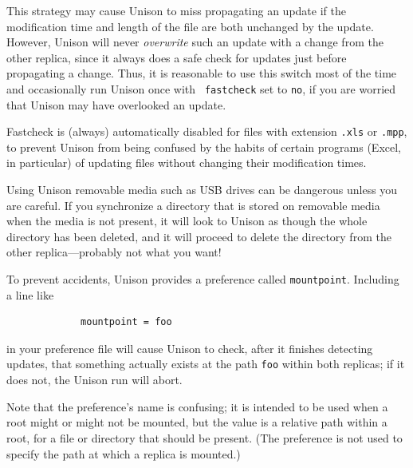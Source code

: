 \documentclass{article}
\begin{document}
This strategy may cause Unison to miss propagating an update if the
 modification time and length of the file are both unchanged
by the update.
However, Unison will never {\em overwrite} such an update with a change
from the other replica, since it always does a safe check for updates
just before propagating a change.  Thus, it is reasonable to use this
switch most of the time and occasionally run Unison once with {\tt
  fastcheck} set to \verb|no|, if you are worried that Unison may have
overlooked an update.

Fastcheck is (always) automatically disabled for files with extension
\verb|.xls| or \verb|.mpp|, to prevent Unison from being confused by the
habits of certain programs (Excel, in particular) of updating files without
changing their modification times.


Using Unison removable media such as USB drives can be dangerous unless you
are careful.  If you synchronize a directory that is stored on removable
media when the media is not present, it will look to Unison as though the
whole directory has been deleted, and it will proceed to delete the
directory from the other replica---probably not what you want!

To prevent accidents, Unison provides a preference called
\verb|mountpoint|.  Including a line like
\begin{verbatim}
             mountpoint = foo
\end{verbatim}
in your preference file will cause Unison to check, after it finishes
detecting updates, that something actually exists at the path
\verb|foo| within both replicas; if it does not, the Unison run will
abort.

Note that the preference's name is confusing; it is intended to be
used when a root might or might not be mounted, but the value is a
relative path within a root, for a file or directory that should be
present.
(The preference is not used to specify the path at which a replica is
mounted.)

\appendix

\end{document}

